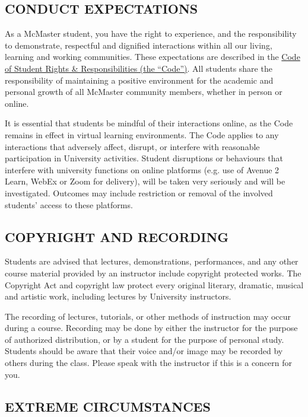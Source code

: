 \documentclass[12pt]{article}
\begin{document}
\subsection*{CONDUCT EXPECTATIONS}

As a McMaster student, you have the right to experience, and the
responsibility to demonstrate, respectful and dignified interactions
within all our living, learning and working communities. These
expectations are described in the
\href{https://secretariat.mcmaster.ca/app/uploads/Code-of-Student-Rights-and-Responsibilities.pdf}{Code of Student Rights \& Responsibilities (the “Code”)}. All students
share the responsibility of maintaining a positive environment for the
academic and personal growth of all McMaster community members,
whether in person or online.

It is essential that students be mindful of their interactions online,
as the Code remains in effect in virtual learning environments. The
Code applies to any interactions that adversely affect, disrupt, or
interfere with reasonable participation in University
activities. Student disruptions or behaviours that interfere with
university functions on online platforms (e.g. use of Avenue 2 Learn,
WebEx or Zoom for delivery), will be taken very seriously and will be
investigated. Outcomes may include restriction or removal of the
involved students’ access to these platforms.

\subsection*{COPYRIGHT AND RECORDING}

Students are advised that lectures, demonstrations, performances, and
any other course material provided by an instructor include copyright
protected works. The Copyright Act and copyright law protect every
original literary, dramatic, musical and artistic work, including
lectures by University instructors.

The recording of lectures, tutorials, or other methods of instruction
may occur during a course. Recording may be done by either the
instructor for the purpose of authorized distribution, or by a student
for the purpose of personal study. Students should be aware that their
voice and/or image may be recorded by others during the class. Please
speak with the instructor if this is a concern for you.

\subsection*{EXTREME CIRCUMSTANCES}
\end{document}
